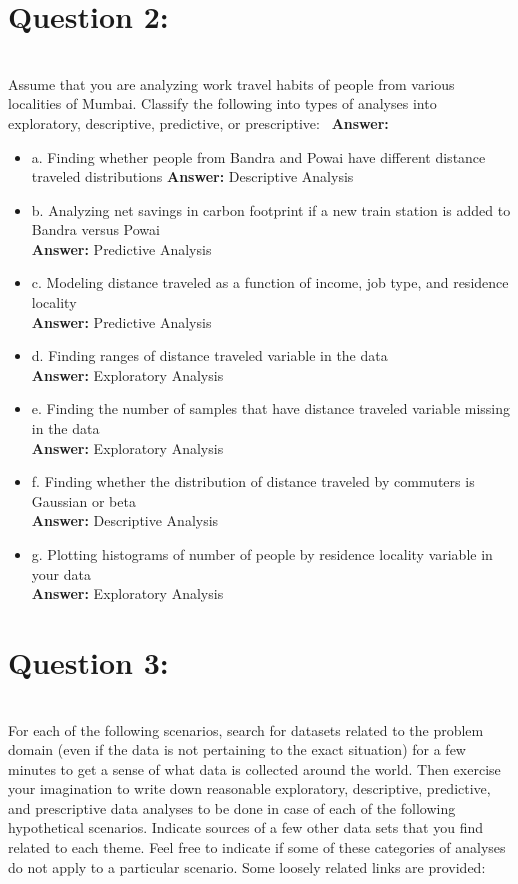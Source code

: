 \documentclass[12pt]{article}
\begin{document}
\section*{Question 2:}\\
Assume that you are analyzing work travel habits of people from various localities of Mumbai. Classify the
following into types of analyses into exploratory, descriptive, predictive, or prescriptive: 
\vspace*{0.5cm}\
\textbf{Answer:} 
\begin{itemize}
    \item a. Finding whether people from Bandra and Powai have different distance traveled distributions
    \textbf{Answer:} Descriptive Analysis
    \item b. Analyzing net savings in carbon footprint if a new train station is added to Bandra versus Powai\\
    \textbf{Answer:} Predictive Analysis
    \item c. Modeling distance traveled as a function of income, job type, and residence locality\\
    \textbf{Answer:} Predictive Analysis
    \item d. Finding ranges of distance traveled variable in the data\\ 
    \textbf{Answer:} Exploratory Analysis
    \item e. Finding the number of samples that have distance traveled variable missing in the data \\
    \textbf{Answer:} Exploratory Analysis
    \item f. Finding whether the distribution of distance traveled by commuters is Gaussian or beta \\
    \textbf{Answer:} Descriptive Analysis
    \item g. Plotting histograms of number of people by residence locality variable in your data \\
    \textbf{Answer:} Exploratory Analysis
\end{itemize}

\section*{Question 3:}\\
For each of the following scenarios, search for datasets related to the problem domain (even if the data is not pertaining to the exact situation) for a few minutes to get a sense of what data is collected around the world. Then exercise your imagination to write down reasonable exploratory, descriptive, predictive, and prescriptive data analyses to be done in case of each of the following hypothetical scenarios. Indicate sources of a few other data sets that you find related to each theme. Feel free to indicate if some of these categories of analyses do not apply to a particular scenario. Some loosely related links are provided: 
\end{document}
